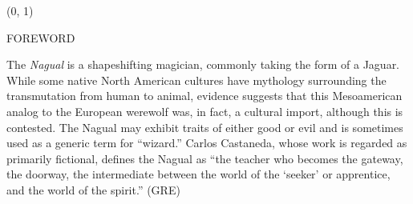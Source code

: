 \documentclass[11pt]{article}
\begin{document}
\begin{textblock}{23}(0, 1)
\begin{center}
\huge FOREWORD
\end{center}
\end{textblock}

\vspace*{0.25\baselineskip}

\begingroup
\begin{center}
The \textit{Nagual} is a shapeshifting magician, commonly taking the form of a Jaguar. While some native North American cultures have mythology surrounding the transmutation from human to animal, evidence suggests that this Mesoamerican analog to the European werewolf was, in fact, a cultural import, although this is contested. The Nagual may exhibit traits of either good or evil and is sometimes used as a generic term for ``wizard.'' Carlos Castaneda, whose work is regarded as primarily fictional, defines the Nagual as ``the teacher who becomes the gateway, the doorway, the intermediate between the world of the `seeker' or apprentice, and the world of the spirit.''
\rightskip\leftskip
\phantom{text} \hfill (GRE)
\end{center}
\endgroup
\end{document}
